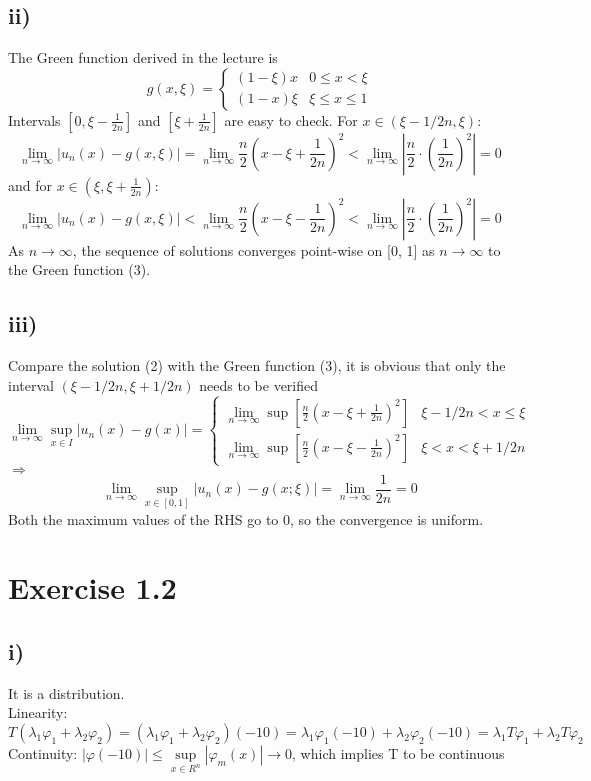 \documentclass{article}
\begin{document}
\subsection*{ii)}
The Green function derived in the lecture is
\begin{equation}
g(x,\xi)=\left\{
	\begin{array}{lcl}
		(1-\xi)x & 0 \leq x < \xi \\
		(1-x)\xi & \xi \leq x \leq 1
	\end{array}
\right.
\end{equation}
Intervals $[0,\xi-\frac{1}{2n}]$ and $[\xi+\frac{1}{2n}]$ are easy to check. For $x\in(\xi-1/2n,\xi)$:
$$
	\lim_{n \to \infty}\left|u_n(x)-g(x,\xi)\right| = \lim_{n \to \infty}\frac{n}{2}(x-\xi+\frac{1}{2n})^2 < \lim_{n \to \infty}\left|\frac{n}{2} \cdot (\frac{1}{2n})^2\right| =0
$$
and for $x\in(\xi,\xi+\frac{1}{2n})$:
$$
	\lim_{n \to \infty}\left|u_n(x)-g(x,\xi)\right| < \lim_{n \to \infty}\frac{n}{2}(x-\xi-\frac{1}{2n})^2 <  \lim_{n \to \infty}\left|\frac{n}{2} \cdot (\frac{1}{2n})^2\right| =0
$$
As $n \to \infty$, the sequence of solutions converges point-wise on [0, 1] as $n \to \infty$ to the Green function (3).

\subsection*{iii)}
Compare the solution (2) with the Green function (3), it is obvious that only the interval $(\xi-1/2n, \xi+1/2n)$ needs to be verified
$$
\lim_{n \to \infty} \sup_{x\in I} \left|u_n(x) - g(x)\right| = \left\{
\begin{array}{lcl}
	\lim\limits_{n \to \infty} \sup \left[ \frac{n}{2}(x-\xi+\frac{1}{2n})^2 \right] & \xi-1/2n < x \leq \xi \\
	\lim\limits_{n \to \infty} \sup \left[ \frac{n}{2}(x-\xi-\frac{1}{2n})^2 \right] & \xi < x < \xi+1/2n
\end{array}
\right.
$$
$\Longrightarrow$
$$
	\lim\limits_{n \to \infty} \sup_{x \in [0,1]}\left|u_n(x) - g(x;\xi)\right| =\lim\limits_{n \to \infty} \frac{1}{2n} = 0
$$
Both the maximum values of the RHS go to 0, so the convergence is uniform.

\section*{Exercise 1.2}
\subsection*{i)}
It is a distribution. \\
Linearity: $T(\lambda_1 \varphi_1 + \lambda_2 \varphi_2)=(\lambda_1 \varphi_1 + \lambda_2 \varphi_2)(-10)=\lambda_1 \varphi_1(-10) + \lambda_2 \varphi_2(-10)=\lambda_1 T\varphi_1 + \lambda_2 T\varphi_2 $ \\
Continuity: $\left|\varphi(-10)\right| \leq \sup\limits_{x \in R^n} \left|\varphi_m(x)\right| \to 0$, which implies T to be continuous
\end{document}
